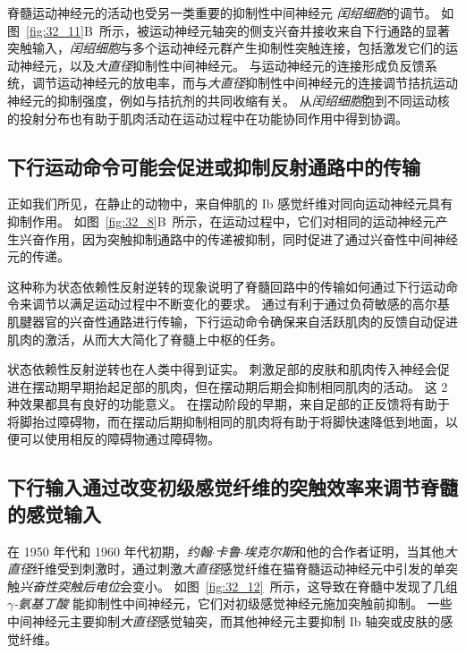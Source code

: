 脊髓运动神经元的活动也受另一类重要的抑制性中间神经元 \textit{闰绍细胞}的调节。
如图~\ref{fig:32_11}B~所示，被运动神经元轴突的侧支兴奋并接收来自下行通路的显著突触输入，\textit{闰绍细胞}与多个运动神经元群产生抑制性突触连接，包括激发它们的运动神经元，以及\textit{大直径}抑制性中间神经元。
与运动神经元的连接形成负反馈系统，调节运动神经元的放电率，而与\textit{大直径}抑制性中间神经元的连接调节拮抗运动神经元的抑制强度，例如与拮抗剂的共同收缩有关。
从\textit{闰绍细胞}胞到不同运动核的投射分布也有助于肌肉活动在运动过程中在功能协同作用中得到协调。



\subsection{下行运动命令可能会促进或抑制反射通路中的传输}

正如我们所见，在静止的动物中，来自伸肌的 Ib 感觉纤维对同向运动神经元具有抑制作用。
如图~\ref{fig:32_8}B~所示，在运动过程中，它们对相同的运动神经元产生兴奋作用，因为突触抑制通路中的传递被抑制，同时促进了通过兴奋性中间神经元的传递。


这种称为状态依赖性反射逆转的现象说明了脊髓回路中的传输如何通过下行运动命令来调节以满足运动过程中不断变化的要求。
通过有利于通过负荷敏感的高尔基肌腱器官的兴奋性通路进行传输，下行运动命令确保来自活跃肌肉的反馈自动促进肌肉的激活，从而大大简化了脊髓上中枢的任务。


状态依赖性反射逆转也在人类中得到证实。
刺激足部的皮肤和肌肉传入神经会促进在摆动期早期抬起足部的肌肉，但在摆动期后期会抑制相同肌肉的活动。
这 2 种效果都具有良好的功能意义。
在摆动阶段的早期，来自足部的正反馈将有助于将脚抬过障碍物，而在摆动后期抑制相同的肌肉将有助于将脚快速降低到地面，以便可以使用相反的障碍物通过障碍物。



\subsection{下行输入通过改变初级感觉纤维的突触效率来调节脊髓的感觉输入}

在 1950 年代和 1960 年代初期，\textit{约翰$\cdot$卡鲁$\cdot$埃克尔斯}和他的合作者证明，当其他\textit{大直径}纤维受到刺激时，通过刺激\textit{大直径}感觉纤维在猫脊髓运动神经元中引发的单突触\textit{兴奋性突触后电位}会变小。
如图~\ref{fig:32_12}~所示，这导致在脊髓中发现了几组\textit{$\gamma$-氨基丁酸} 能抑制性中间神经元，它们对初级感觉神经元施加突触前抑制。 
一些中间神经元主要抑制\textit{大直径}感觉轴突，而其他神经元主要抑制 Ib 轴突或皮肤的感觉纤维。


